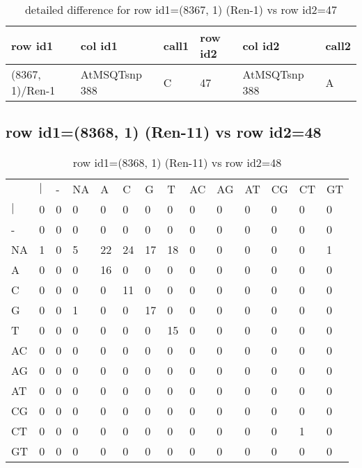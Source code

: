 \begin{center}
\begin{longtable}{|l|l|l|l|l|l|}
\caption{detailed difference for row id1=(8367, 1) (Ren-1) vs row id2=47} \label{table_dm599}\\
\hline
row id1&col id1&call1&row id2&col id2&call2\\
\hline
(8367, 1)/Ren-1&AtMSQTsnp 388&C&47&AtMSQTsnp 388&A\\
\hline
\end{longtable}
\end{center}

\subsection{row id1=(8368, 1) (Ren-11) vs row id2=48}
\begin{center}
\begin{longtable}{|l|l|l|l|l|l|l|l|l|l|l|l|l|l|}
\caption{row id1=(8368, 1) (Ren-11) vs row id2=48} \label{table_dm600}\\
\hline
\\
\hline
&$|$&-&NA&A&C&G&T&AC&AG&AT&CG&CT&GT\\
$|$&0&0&0&0&0&0&0&0&0&0&0&0&0\\
-&0&0&0&0&0&0&0&0&0&0&0&0&0\\
NA&1&0&5&22&24&17&18&0&0&0&0&0&1\\
A&0&0&0&16&0&0&0&0&0&0&0&0&0\\
C&0&0&0&0&11&0&0&0&0&0&0&0&0\\
G&0&0&1&0&0&17&0&0&0&0&0&0&0\\
T&0&0&0&0&0&0&15&0&0&0&0&0&0\\
AC&0&0&0&0&0&0&0&0&0&0&0&0&0\\
AG&0&0&0&0&0&0&0&0&0&0&0&0&0\\
AT&0&0&0&0&0&0&0&0&0&0&0&0&0\\
CG&0&0&0&0&0&0&0&0&0&0&0&0&0\\
CT&0&0&0&0&0&0&0&0&0&0&0&1&0\\
GT&0&0&0&0&0&0&0&0&0&0&0&0&0\\
\hline
\end{longtable}
\end{center}


